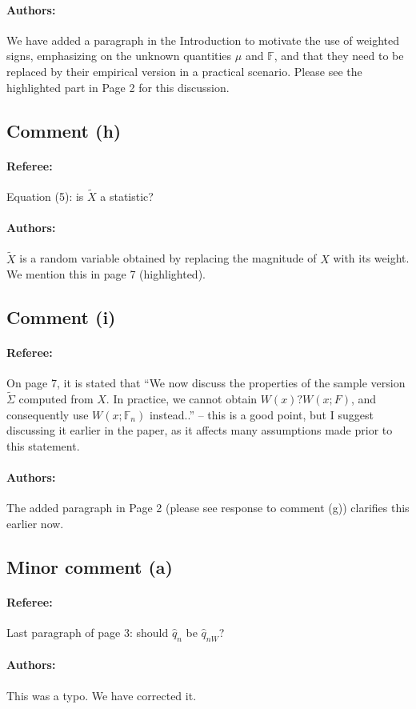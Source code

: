 \documentclass[11pt,letterpaper]{article}
\newcommand{\BF}{{\mathbb{F}}}
\theoremstyle{definition} \newtheorem{Definition}[Theorem]{Definition}
\begin{document}
\paragraph{Authors:}
We have added a paragraph in the Introduction to motivate the use of weighted signs, emphasizing on the unknown quantities $\mu$ and $\BF$, and that they need to be replaced by their empirical version in a practical scenario. Please see the highlighted part in Page 2 for this discussion.

\subsection*{Comment (h)}
\paragraph{Referee:}
Equation (5): is $\tilde X$ a statistic?

\paragraph{Authors:}
$\tilde X$ is a random variable obtained by replacing the magnitude of $X$ with its weight. We mention this in page 7 (highlighted).

\subsection*{Comment (i)}
\paragraph{Referee:} On page 7, it is stated that “We now discuss the properties of the sample version $\tilde \Sigma$ computed from $X$. In practice, we cannot obtain $W(x)?W(x; F)$, and consequently use $W(x; \BF_n)$ instead..” – this is a good point, but I suggest discussing it earlier in the paper, as it affects many assumptions made prior to this statement.

\paragraph{Authors:}
The added paragraph in Page 2 (please see response to comment (g)) clarifies this earlier now.

\subsection*{Minor comment (a)}
\paragraph{Referee:}
Last paragraph of page 3: should $\hat q_n$ be $\hat q_{n W}$?

\paragraph{Authors:}
This was a typo. We have corrected it.

%



\end{document}
